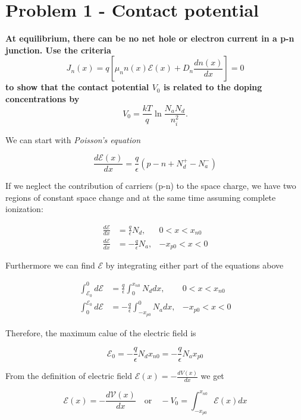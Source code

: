 \section{Problem 1 - Contact potential}

\textbf{At equilibrium, there can be no net hole or electron current in a p-n junction. Use the criteria\[J_{n}(x)=q\left[\mu_{n} n(x) \mathscr{E}(x)+D_{n} \frac{d n(x)}{d x}\right]=0\]to show that the contact potential \( V_{0} \) is related to the doping concentrations by\[V_{0}=\frac{k T}{q} \ln \frac{N_{a} N_{d}}{n_{i}^{2}} .\]
}

We can start with \textit{Poisson's equation}

\[\frac{d\mathscr{E}(x)}{dx}=\frac{q}{\epsilon}\left(p-n+N_d^+-N_a^-\right)\]

If we neglect the contribution of carriers (p-n) to the space charge, we have two regions of constant space change and at the same time assuming complete ionization:

\begin{align*}
    \frac{d \mathscr{E}}{d x} &= \frac{q}{\epsilon} N_{d},  &0<x<x_{n 0} \\
    \frac{d \mathscr{E}}{d x} &= -\frac{q}{\epsilon} N_{a}, &-x_{p 0}<x<0
\end{align*}

Furthermore we can find $\mathscr{E}$ by integrating either part of the equations above


\begin{align*}
    \int_{\mathscr{E}_0}^{0}d \mathscr{E} &= \frac{q}{\epsilon} \int_{0}^{x_{n0}}N_{d}dx,  &0<x<x_{n 0} \\
    \int_{0}^{\mathscr{E}_0}d \mathscr{E} &= -\frac{q}{\epsilon} \int_{-x_{p0}}^{0}N_{a}dx, &-x_{p 0}<x<0
\end{align*}

Therefore, the maximum calue of the electric field is

\[\mathscr{E}_0=-\frac{q}{\epsilon}N_dx_{n0}=-\frac{q}{\epsilon}N_ax_{p0}\]

From the definition of electric field $\mathscr{E}(x)=-\frac{dV(x)}{dx}$ we get

\[ \mathscr{E}(x)=-\frac{d \mathscr{V}(x)}{d x} \quad\text{or}\quad -V_{0}=\int_{-x_{p 0}}^{x_{n 0}} \mathscr{E}(x) d x \]



